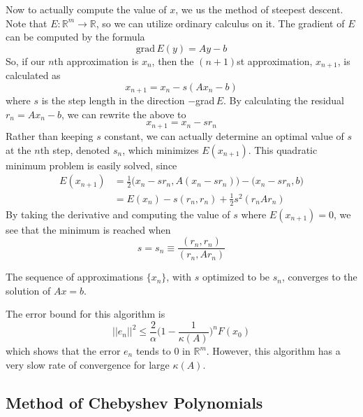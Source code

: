 \documentclass{article}
\begin{document}
    Now to actually compute the value of $x$, we us the method of steepest descent. Note that $E: \mathbb{R}^m \longrightarrow \mathbb{R}$, so we can utilize ordinary calculus on it. The gradient of $E$ can be computed by the formula 
    \[\text{grad}\,E(y) = A y - b\]
    So, if our $n$th approximation is $x_n$, then the $(n+1)$st approximation, $x_{n+1}$, is calculated as
    \[x_{n+1} = x_n - s (Ax_n - b)\]
    where $s$ is the step length in the direction $-$grad$\,E$. By calculating the residual $r_n = A x_n - b$, we can rewrite the above to
    \[x_{n+1} = x_n - s r_n\]
    Rather than keeping $s$ constant, we can actually determine an optimal value of $s$ at the $n$th step, denoted $s_n$, which minimizes $E(x_{n+1})$. This quadratic minimum problem is easily solved, since
    \begin{align*}
        E(x_{n+1}) & = \frac{1}{2} \big(x_n - s r_n, A(x_n - s r_n) \big) - \big( x_n - s r_n, b\big) \\
        & = E(x_n) - s (r_n, r_n) + \frac{1}{2} s^2 (r_n A r_n)
    \end{align*}
    By taking the derivative and computing the value of $s$ where $E (x_{n+1}) = 0$, we see that the minimum is reached when 
    \[s = s_n \equiv \frac{(r_n, r_n)}{(r_n, A r_n)}\]

    \begin{theorem}
    The sequence of approximations $\{x_n\}$, with $s$ optimized to be $s_n$, converges to the solution of $A x = b$. 
    \end{theorem}

    The error bound for this algorithm is 
    \[||e_n||^2 \leq \frac{2}{\alpha} \bigg( 1-\frac{1}{\kappa(A)} \bigg)^n F(x_0)\]
    which shows that the error $e_n$ tends to $0$ in $\mathbb{R}^m$. However, this algorithm has a very slow rate of convergence for large $\kappa(A)$. 

  \subsection{Method of Chebyshev Polynomials}
\end{document}
